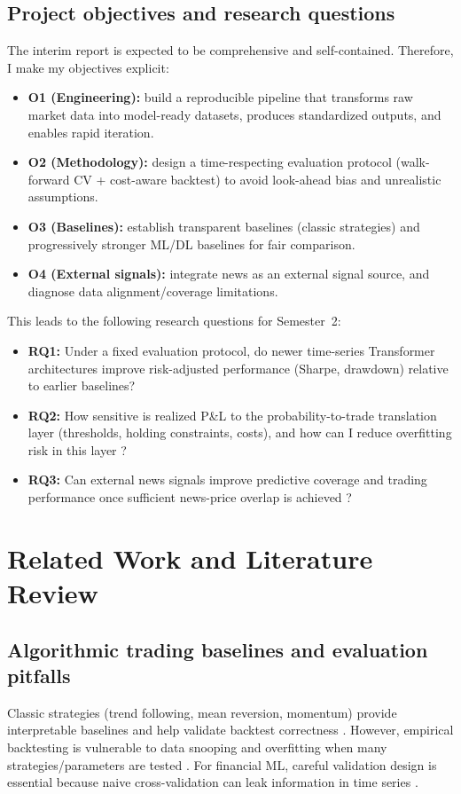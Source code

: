 \documentclass[12pt,a4paper,oneside]{report}
\begin{document}
\section{Project objectives and research questions}
The interim report is expected to be comprehensive and self-contained. Therefore, I make my objectives explicit:
\begin{itemize}
  \item \textbf{O1 (Engineering):} build a reproducible pipeline that transforms raw market data into model-ready datasets, produces standardized outputs, and enables rapid iteration.
  \item \textbf{O2 (Methodology):} design a time-respecting evaluation protocol (walk-forward CV + cost-aware backtest) to avoid look-ahead bias and unrealistic assumptions.
  \item \textbf{O3 (Baselines):} establish transparent baselines (classic strategies) and progressively stronger ML/DL baselines for fair comparison.
  \item \textbf{O4 (External signals):} integrate news as an external signal source, and diagnose data alignment/coverage limitations.
\end{itemize}
This leads to the following research questions for Semester~2:
\begin{itemize}
  \item \textbf{RQ1:} Under a fixed evaluation protocol, do newer time-series Transformer architectures improve risk-adjusted performance (Sharpe, drawdown) relative to earlier baselines?
  \item \textbf{RQ2:} How sensitive is realized P\&L to the probability-to-trade translation layer (thresholds, holding constraints, costs), and how can I reduce overfitting risk in this layer \citep{bailey2014,lopezdeprado2018,white2000}?
  \item \textbf{RQ3:} Can external news signals improve predictive coverage and trading performance once sufficient news-price overlap is achieved \citep{araci2019finbert,tetlock2007}?
\end{itemize}

\chapter{Related Work and Literature Review}
\section{Algorithmic trading baselines and evaluation pitfalls}
Classic strategies (trend following, mean reversion, momentum) provide interpretable baselines and help validate backtest correctness \citep{chan2013}. However, empirical backtesting is vulnerable to data snooping and overfitting when many strategies/parameters are tested \citep{white2000,bailey2014}. For financial ML, careful validation design is essential because naive cross-validation can leak information in time series \citep{bergmeir2018}.
\end{document}
